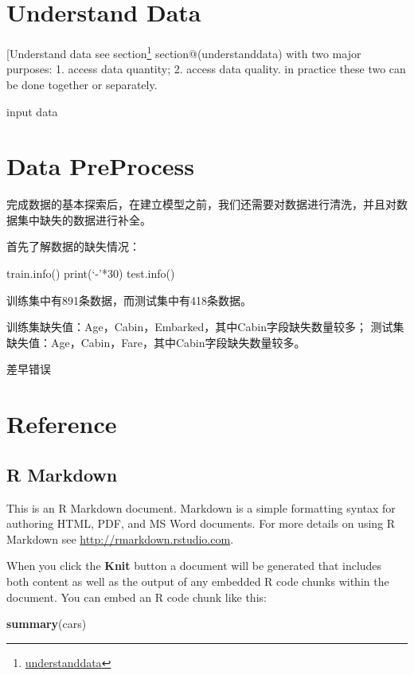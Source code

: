 \documentclass[
]{book}
\newenvironment{Shaded}{\begin{snugshade}}{\end{snugshade}}
\newcommand{\KeywordTok}[1]{\textcolor[rgb]{0.13,0.29,0.53}{\textbf{#1}}}
\newcommand{\NormalTok}[1]{#1}
\renewcommand{\href}[2]{#2\footnote{\url{#1}}}
\begin{document}
\hypertarget{understand-data}{%
\chapter{Understand Data}\label{understand-data}}

{[}Understand data see \href{understanddata}{section} section@(understanddata) with two major purposes: 1. access data quantity; 2. access data quality. in practice these two can be done together or separately.

input data

\hypertarget{data-preprocess}{%
\chapter{Data PreProcess}\label{data-preprocess}}

完成数据的基本探索后，在建立模型之前，我们还需要对数据进行清洗，并且对数据集中缺失的数据进行补全。

首先了解数据的缺失情况：

train.info()
print(`-'*30)
test.info()

训练集中有891条数据，而测试集中有418条数据。

训练集缺失值：Age，Cabin，Embarked，其中Cabin字段缺失数量较多； 测试集缺失值：Age，Cabin，Fare，其中Cabin字段缺失数量较多。

差早错误

\hypertarget{reference}{%
\chapter*{Reference}\label{reference}}


\hypertarget{r-markdown}{%
\section{R Markdown}\label{r-markdown}}

This is an R Markdown document. Markdown is a simple formatting syntax for authoring HTML, PDF, and MS Word documents. For more details on using R Markdown see \url{http://rmarkdown.rstudio.com}.

When you click the \textbf{Knit} button a document will be generated that includes both content as well as the output of any embedded R code chunks within the document. You can embed an R code chunk like this:

\begin{Shaded}
\begin{Highlighting}[]
\KeywordTok{summary}\NormalTok{(cars)}
\end{Highlighting}
\end{Shaded}
\end{document}
